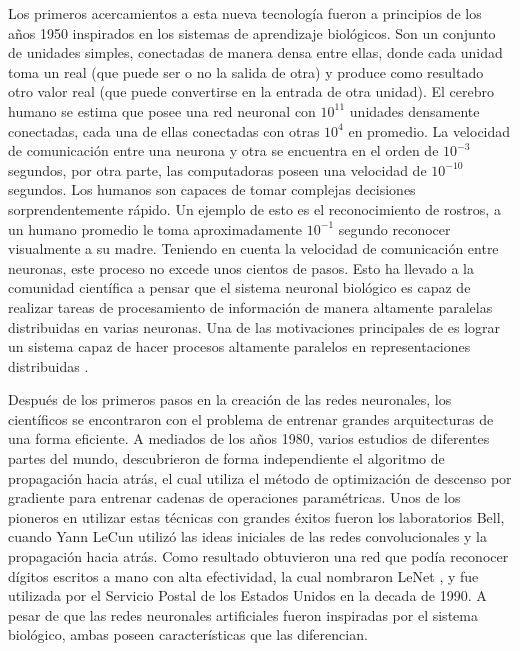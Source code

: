 Los primeros acercamientos a esta nueva tecnología fueron a principios de los a\~nos 1950 inspirados en los sistemas de aprendizaje biológicos. Son un conjunto de unidades simples, conectadas de manera densa entre ellas, donde cada unidad toma un real (que puede ser o no la salida de otra) y produce como resultado otro valor real (que puede convertirse en la entrada de otra unidad). El cerebro humano se estima que posee una red neuronal con $10^{11}$ unidades densamente conectadas, cada una de ellas conectadas con otras $10^{4}$ en promedio. La velocidad de comunicación entre una neurona y otra se encuentra en el orden de $10^{-3}$ segundos, por otra parte, las computadoras poseen una velocidad de $10^{-10}$ segundos. Los humanos son capaces de tomar complejas decisiones sorprendentemente rápido. Un ejemplo de esto es el reconocimiento de rostros, a un humano promedio le toma aproximadamente $10^{-1}$ segundo reconocer visualmente a su madre. Teniendo en cuenta la velocidad de comunicación entre neuronas, este proceso no excede unos cientos de pasos. Esto ha llevado a la comunidad científica a pensar que el sistema neuronal biológico es capaz de realizar tareas de procesamiento de información de manera altamente paralelas distribuidas en varias neuronas. Una de las motivaciones principales de es lograr un sistema capaz de hacer procesos altamente paralelos en representaciones distribuidas \cite{brown1990learning,churchland1992computational,mitchell1997machine}.

Después de los primeros pasos en la creación de las redes neuronales, los científicos se encontraron con el problema de entrenar grandes arquitecturas de una forma eficiente. A mediados de los a\~nos 1980, varios estudios de diferentes partes del mundo, descubrieron de forma independiente el algoritmo de propagación hacia atrás, el cual utiliza el método de optimizaci\'on de descenso por gradiente para entrenar cadenas de operaciones param\'etricas. Unos de los pioneros en utilizar estas técnicas con grandes éxitos fueron los laboratorios Bell, cuando Yann LeCun utilizó las ideas iniciales de las redes convolucionales y la propagación hacia atrás. Como resultado obtuvieron una red que podía reconocer dígitos escritos a mano con alta efectividad, la cual nombraron LeNet \cite{lecun1995comparison}, y fue utilizada por el Servicio Postal de los Estados Unidos en la decada de 1990. A pesar de que las redes neuronales artificiales fueron inspiradas por el sistema biológico, ambas poseen características que las diferencian.

